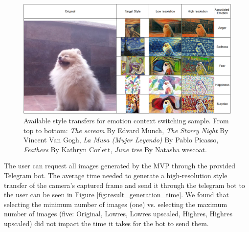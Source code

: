 \begin{figure}[h]
    \centering
    \includegraphics[width = \textwidth]{resources/styletransfer_emogrid.png}
    \caption{Available style transfers for emotion context switching sample. From top to bottom:
        \emph{The scream} By Edvard Munch,
        \emph{The Starry Night} By Vincent Van Gogh,
        \emph{La Musa (Mujer Leyendo)} By Pablo Picasso,
        \emph{Feathers} By Kathryn Corlett,
        \emph{June tree} By Natasha wescoat.
    } \label{fig:style_results_grid}
\end{figure}
The user can request all images generated by the MVP through the provided Telegram bot. The average time needed to generate a high-resolution style transfer of the camera's captured frame and send it through the telegram bot to the user can be seen in Figure \ref{fig:result_generation_time}. We found that selecting the minimum number of images (one) vs. selecting the maximum number of images (five: Original, Lowres, Lowres upscaled, Highres, Highres upscaled) did not impact the time it takes for the bot to send them.